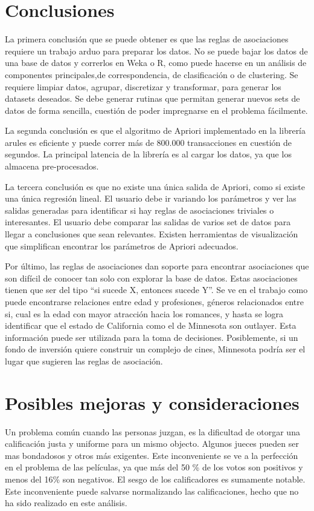 \documentclass[journal]{IEEEtran}
\begin{document}
\section{Conclusiones}
La primera conclusión que se puede obtener es que las reglas de asociaciones requiere
un trabajo arduo para preparar los datos. No se puede bajar los datos de una base de datos
y correrlos en Weka o R, como puede hacerse en un análisis de componentes 
principales,de correspondencia, de clasificación o de clustering. Se requiere limpiar 
datos, agrupar, discretizar y transformar, 
para generar los datasets deseados. Se debe generar rutinas que permitan generar nuevos
sets de datos de forma sencilla, cuestión de poder impregnarse en el problema fácilmente.

La segunda conclusión es que el algoritmo de Apriori implementado en la librería arules
es eficiente y puede correr más de 800.000 transacciones en cuestión de segundos. La principal
latencia de la librería es al cargar los datos, ya que los almacena pre-procesados.

La tercera conclusión es que no existe una única salida de Apriori, como si existe una única
regresión lineal. El usuario debe ir variando
los parámetros y ver las salidas generadas para identificar si hay reglas de asociaciones
triviales o interesantes. El usuario debe comparar las salidas de varios set de datos para
llegar a conclusiones que sean relevantes. Existen herramientas de visualización que simplifican
encontrar los parámetros de Apriori adecuados.

Por último, las reglas de asociaciones dan soporte para encontrar asociaciones
que son difícil de conocer tan solo con explorar la base de datos. Estas asociaciones tienen
que ser del tipo ``si sucede X, entonces sucede Y''. Se ve en el trabajo
como puede encontrarse relaciones entre edad y profesiones, géneros relacionados entre si,
cual es la edad con mayor atracción hacia los romances, y hasta se logra identificar
que el estado de California como el de Minnesota son outlayer. Esta información puede
ser utilizada para la toma de decisiones. Posiblemente, si un
fondo de inversión quiere construir un complejo de cines, Minnesota podría ser el 
lugar que sugieren las reglas de asociación.

\section{Posibles mejoras y consideraciones}

Un problema común cuando las personas juzgan, es la dificultad de otorgar una
calificación justa y uniforme para un mismo objecto. Algunos jueces pueden ser
mas bondadosos y otros más exigentes. Este inconveniente se ve a la perfección
en el problema de las películas, ya que más del 50 \% de los votos son positivos
y menos del 16\% son negativos. El sesgo de los calificadores es sumamente notable.
Este inconveniente puede salvarse normalizando las calificaciones, hecho que no
ha sido realizado en este análisis.
\end{document}
